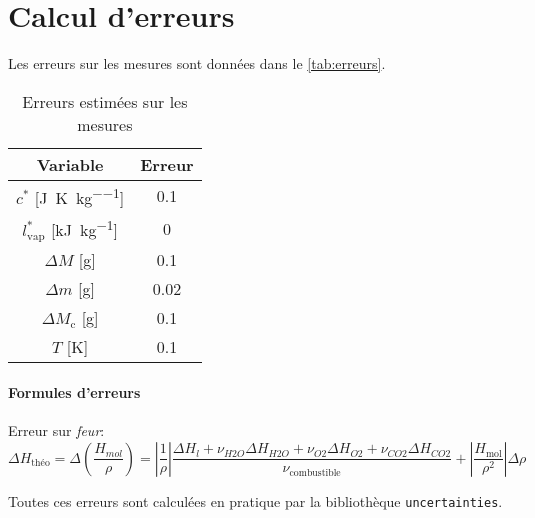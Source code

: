 \section{Calcul d'erreurs}
\label{sec:erreurs}

Les erreurs sur les mesures sont données dans le \autoref{tab:erreurs}.

\begin{table}[h]
    \centering
    \begin{tabulary}{\textwidth}{C C}
        \toprule
        Variable & Erreur \\
        \midrule
        \(c^*\) [\si{\joule\per\kelvin\per\kilo\gram}] & 0.1 \\
        \(l_\textrm{vap}^*\) [\si{\kilo\joule\per\kilo\gram}] & 0 \\
        \(\Delta M\) [\si{\gram}] & 0.1 \\
        \(\Delta m\) [\si{\gram}] & 0.02 \\
        \(\Delta M_\textrm{c}\) [\si{\gram}] & 0.1 \\
        \(T\) [\si{\kelvin}] & 0.1 \\
        \bottomrule
    \end{tabulary}
    \caption{Erreurs estimées sur les mesures}
    \label{tab:erreurs}
\end{table}

\paragraph*{Formules d'erreurs}

Erreur sur \textit{feur}:
\begin{equation}
    \Delta H_\textrm{théo} = \Delta\left(\frac{H_{mol}}{\rho}\right) = \left|\frac{1}{\rho}\right| \frac{\Delta H_{l} + \nu_{H2O} \Delta H_{H2O} + \nu_{O2} \Delta H_{O2} + \nu_{CO2} \Delta H_{CO2}}{\nu_\textrm{combustible}} + \left|\frac{H_\textrm{mol}}{\rho^2}\right| \Delta\rho
\end{equation}

Toutes ces erreurs sont calculées en pratique par la bibliothèque \texttt{uncertainties}.

